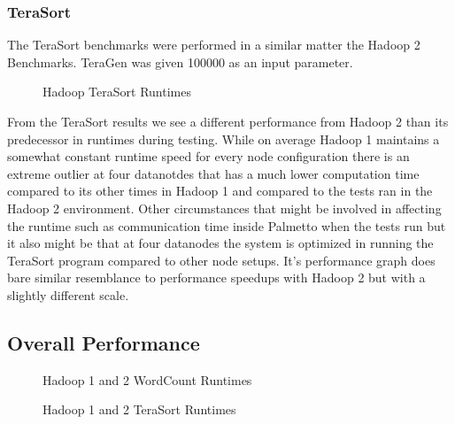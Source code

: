 \documentclass[conference]{IEEEtran}
\begin{document}
					\subsubsection{TeraSort}
						The TeraSort benchmarks were performed in a similar matter the Hadoop 2 Benchmarks. TeraGen was given 100000 as an input parameter.
						\begin{figure}[h]
                   					\begin{center}
                       						
                        						\caption{Hadoop TeraSort Runtimes}
                    				\end{center}
                  			\end{figure}
					
					From the TeraSort results we see a different performance from Hadoop 2 than its predecessor in runtimes during testing. While on average Hadoop 1 maintains a somewhat constant runtime speed for every node configuration there is an extreme outlier at four datanotdes that has a much lower computation time compared to its other times in Hadoop 1 and compared to the tests ran in the Hadoop 2 environment. Other circumstances that might be involved in affecting the runtime such as communication time inside Palmetto when the tests run but it also might be that at four datanodes the system is optimized in running the TeraSort program compared to other node setups. It's performance graph does bare similar resemblance to performance speedups with Hadoop 2 but with a slightly different scale.
				\subsection{Overall Performance}
						\begin{figure}[h]
                   					\begin{center}
                       						
                        						\caption{Hadoop 1 and 2 WordCount Runtimes}
                    					\end{center}
						\end{figure}
						\begin{figure}[h]
                   					\begin{center}
                       					
                        					\caption{Hadoop 1 and 2 TeraSort Runtimes}
                    				\end{center}
						\end{figure}
\end{document}
